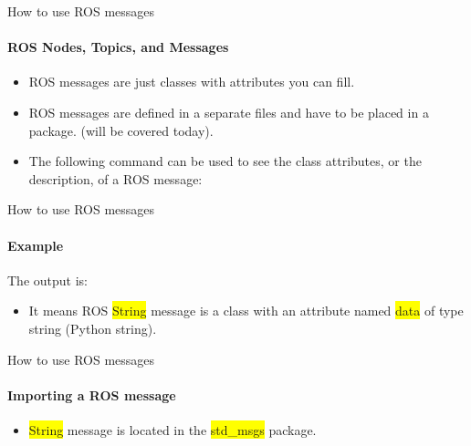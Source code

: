 \documentclass{beamer}
\begin{document}
\begin{frame}{How to use ROS messages}
    \framesubtitle{ROS Nodes, Topics, and Messages}
    \begin{itemize}
        \item ROS messages are just classes with attributes you can fill.
        
        \item ROS messages are defined in a separate files and have to be placed in a package. (will be covered today).
        
        \item The following command can be used to see the class attributes, or the description, of a ROS message:
        
        \begin{terminal}
            \color{green} 
        \end{terminal}
    \end{itemize}
    
\end{frame}


\begin{frame}{How to use ROS messages}
    \framesubtitle{Example}

        \begin{terminal}
            \color{green} 
        \end{terminal}

    The output is:
    
            \begin{terminal}
                \color{green} 
                
            \end{terminal}
   
   \begin{itemize}
       \item It means ROS {\ttfamily \colorbox{yellow}{String}} message is a class with an attribute named {\ttfamily \colorbox{yellow}{data}} of type string (Python string).
   \end{itemize} 
\end{frame}


\begin{frame}{How to use ROS messages}
    \framesubtitle{Importing a ROS message}
    
    
    \begin{itemize}
        \item {\ttfamily \colorbox{yellow}{String}} message is located in the {\ttfamily \colorbox{yellow}{std\_msgs}} package.
    \end{itemize} 
\end{frame}
\end{document}

